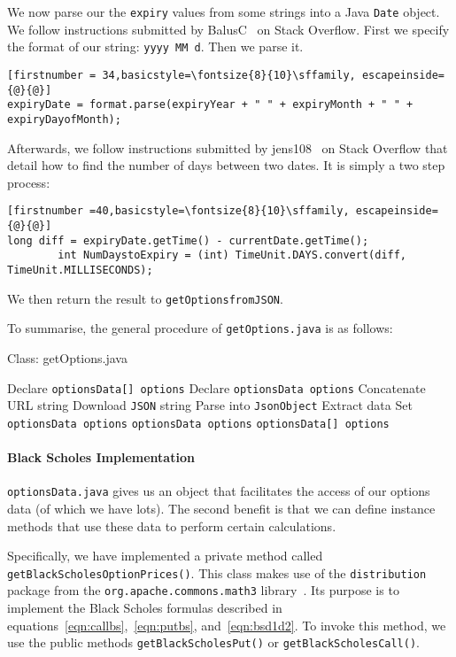 \documentclass[../Dissertation.tex]{subfiles}
\begin{document}
We now parse our the \lstinline|expiry| values from some strings into a Java \lstinline|Date| object.
We follow instructions submitted by BalusC~\cite{BalusC:2010b} on Stack Overflow.
First we specify the format of our string: \lstinline|yyyy MM d|.
Then we parse it.
\begin{lstlisting}[firstnumber = 34,basicstyle=\fontsize{8}{10}\sffamily, escapeinside={@}{@}]
expiryDate = format.parse(expiryYear + " " + expiryMonth + " " + expiryDayofMonth);
\end{lstlisting}
Afterwards, we follow instructions submitted by jens108~\cite{jens108:2013} on Stack Overflow that detail how to find the number of days between two dates.
It is simply a two step process:
\begin{lstlisting}[firstnumber =40,basicstyle=\fontsize{8}{10}\sffamily, escapeinside={@}{@}]
long diff = expiryDate.getTime() - currentDate.getTime();
        int NumDaystoExpiry = (int) TimeUnit.DAYS.convert(diff, TimeUnit.MILLISECONDS);
\end{lstlisting}
We then return the result to \lstinline|getOptionsfromJSON|.

To summarise, the general procedure of \lstinline|getOptions.java| is as follows:
					\begin{algorithm}[H]
						\caption{Class: getOptions.java}
						\begin{algorithmic}[1]
							\label{class:getOptions}							
							\State Declare \lstinline|optionsData[] options|						
							\State Declare \lstinline|optionsData options|			
							\State Concatenate URL string
							\State Download \lstinline|JSON| string
							\State Parse into \lstinline|JsonObject|
							\State Extract data
							\State Set \lstinline|optionsData options|
							\State \Return \lstinline|optionsData options|
							\EndFor
							\State \Return \lstinline|optionsData[] options|
						\EndFunction
						\end{algorithmic}
					\end{algorithm}

\paragraph{Black Scholes Implementation}

\lstinline|optionsData.java| gives us an object that facilitates the access of our options data (of which we have lots).
The second benefit is that we can define instance methods that use these data to perform certain calculations.

Specifically, we have implemented a private method called \lstinline|getBlackScholesOptionPrices()|. 
This class makes use of the \lstinline|distribution| package from the \lstinline|org.apache.commons.math3| library~\cite{Apache:Math3}.
Its purpose is to implement the Black Scholes formulas described in equations~\ref{eqn:callbs},~\ref{eqn:putbs}, and~\ref{eqn:bsd1d2}.
To invoke this method, we use the public methods \lstinline|getBlackScholesPut()| or \lstinline|getBlackScholesCall()|.
\end{document}
